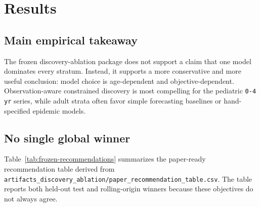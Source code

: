 \section{Results}

\subsection{Main empirical takeaway}

The frozen discovery-ablation package does not support a claim that one model
dominates every stratum. Instead, it supports a more conservative and more
useful conclusion: model choice is age-dependent and objective-dependent.
Observation-aware constrained discovery is most compelling for the pediatric
\texttt{0-4 yr} series, while adult strata often favor simple forecasting
baselines or hand-specified epidemic models.

\subsection{No single global winner}

Table~\ref{tab:frozen-recommendations} summarizes the paper-ready
recommendation table derived from
\texttt{artifacts\_discovery\_ablation/paper\_recommendation\_table.csv}. The
table reports both held-out test and rolling-origin winners because these
objectives do not always agree.

